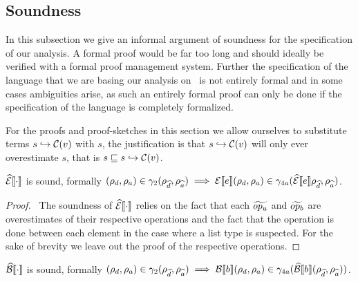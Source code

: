 \subsection{Soundness}\label{subsec:soundness}

In this subsection we give an informal argument of soundness for the specification of our analysis.
A formal proof would be far too long and should ideally be verified with a formal proof management system.
Further the specification of the language that we are basing our analysis on~\cite{halder_abstract_2012} is not entirely formal and in some cases ambiguities arise, as such an entirely formal proof can only be done if the specification of the language is completely formalized.

For the proofs and proof-sketches in this section we allow ourselves to substitute terms $s \hookrightarrow \mathcal{C}(v)$ with $s$, the justification is that $s \hookrightarrow \mathcal{C}(v)$ will only ever overestimate $s$, that is $s \sqsubseteq s \hookrightarrow \mathcal{C}(v)$.

\begin{conjecture}\label{thm:sound-exp}
    $\widehat{\mathcal{E}}\llbracket \cdot \rrbracket$ is sound, formally $(\rho_d, \rho_a) \in \gamma_2(\rho_{\widehat{d}}, \rho_{\widehat{a}}) \implies \mathcal{E}\llbracket e \rrbracket(\rho_d, \rho_a) \in \gamma_{4a}(\widehat{\mathcal{E}}\llbracket e \rrbracket\rho_{\widehat{d}}, \rho_{\widehat{a}})$.
\end{conjecture}
\begin{proof}
    \pfsketch\
    The soundness of $\widehat{\mathcal{E}}\llbracket \cdot \rrbracket$ relies on the fact that each $\widetilde{op_u}$ and $\widetilde{op_b}$ are overestimates of their respective operations and the fact that the operation is done between each element in the case where a list type is suspected.
    For the sake of brevity we leave out the proof of the respective operations.
\end{proof}


\begin{conjecture}\label{thm:sound-bool}
    $\widehat{\mathcal{B}}\llbracket \cdot \rrbracket$ is sound, formally $(\rho_d, \rho_a) \in \gamma_2(\rho_{\widehat{d}}, \rho_{\widehat{a}}) \implies \mathcal{B}\llbracket b \rrbracket(\rho_d, \rho_a) \in \gamma_{4a}(\widehat{\mathcal{B}}\llbracket b \rrbracket(\rho_{\widehat{d}}, \rho_{\widehat{a}}))$.
\end{conjecture}


